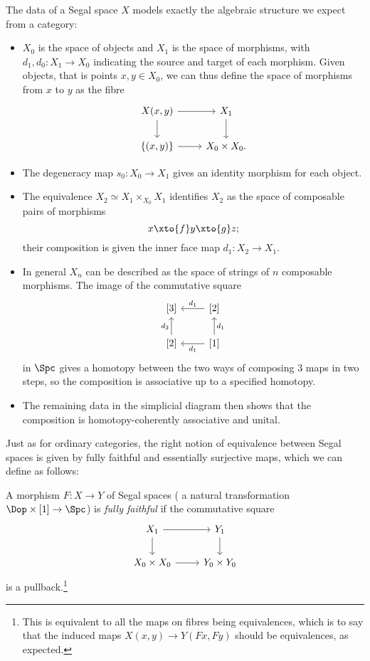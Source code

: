 \documentclass[a4paper,12pt]{article}
\begin{document}
The data of a Segal space $X$ models exactly the algebraic structure
we expect from a category:
\begin{itemize}
\item $X_{0}$ is the space of objects and $X_{1}$ is the space of
  morphisms, with $d_{1},d_{0} \colon X_{1} \to X_{0}$ indicating the
  source and target of each morphism. Given objects, that is points
  $x,y \in X_{0}$, we can thus define the space of morphisms from $x$
  to $y$ as the fibre
  \[
    \begin{tikzcd}
      X(x,y) \ar[r] \ar[d] & X_{1} \ar[d] \\
      \{(x,y)\} \ar[r] & X_{0} \times X_{0}.
    \end{tikzcd}
  \]
\item The degeneracy map $s_{0} \colon X_{0} \to X_{1}$ gives an
  identity morphism for each object.
\item The equivalence $X_{2} \simeq X_{1} \times_{X_{0}} X_{1}$
  identifies $X_{2}$ as the space of composable pairs of morphisms
  \[ x \xto{f} y \xto{g} z;\]
  their composition is given the inner face map $d_{1} \colon X_{2}
  \to X_{1}$.
\item In general $X_{n}$ can be described as the space of strings of
  $n$ composable morphisms. The image of the commutative square
  \[
    \begin{tikzcd}
      {[3]} & {[2]} \ar[l, "d_{1}"{swap}] \\
      {[2]} \ar[u, "d_{2}"]  & {[1]} \ar[l, "d_{1}"] \ar[u, "d_{1}"{swap}]
    \end{tikzcd}
  \]
  in $\Spc$ gives a homotopy between the two ways of composing 3 maps
  in two steps, so the composition is associative up to a specified
  homotopy.
\item The remaining data in the simplicial diagram then shows that the
  composition is homotopy-coherently associative and unital.  
\end{itemize}
Just as for ordinary categories, the right notion of equivalence
between Segal spaces is given by fully faithful and essentially
surjective maps, which we can define as follows:

\begin{defn}\label{def:ff}
  A morphism $F \colon X \to Y$ of Segal spaces (\ie{} a natural
  transformation $\Dop \times [1] \to \Spc$) is \emph{fully faithful}
  if the commutative square
  \[
    \begin{tikzcd}
      X_{1} \ar[r] \ar[d] & Y_{1} \ar[d] \\
      X_{0} \times X_{0} \ar[r] & Y_{0} \times Y_{0}
    \end{tikzcd}
  \]
  is a pullback.\footnote{This is equivalent to all the maps on fibres
    being equivalences, which is to say that the induced maps $X(x,y)
    \to Y(Fx,Fy)$ should be equivalences, as expected.}
\end{defn}
\end{document}
